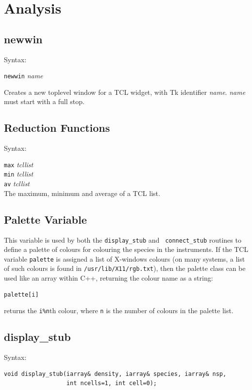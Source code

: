 \section{Analysis}\label{analysis}

\subsection{newwin}\label{TCLnewwin}

Syntax:

{\tt newwin} {\em name}

Creates a new toplevel window for a TCL widget, with Tk identifier
{\em name}. {\em name} must start with a full stop.

\subsection{Reduction Functions}

Syntax:

{\tt max} {\em tcllist}\\
{\tt min} {\em tcllist}\\
{\tt av} {\em tcllist}\\

The maximum, minimum and average of a TCL list.

\subsection{Palette Variable}\label{palette}

This variable is used by both the {\tt display\_stub} and {\tt
  connect\_stub} routines to define a palette of colours for colouring
  the species in the instruments. If the TCL variable {\tt palette} is
  assigned a list of X-windows colours (on many systems, a list of
  such colours is found in {\tt /usr/lib/X11/rgb.txt}),
  then the palette class can be used like an array within C++,
  returning the colour name as a string:
\begin{verbatim}
palette[i]
\end{verbatim}
returns the \verb|i%n|th colour, where {\tt n} is the number of
colours in the palette list.

\subsection{display\_stub}

Syntax:

\begin{verbatim}
void display_stub(iarray& density, iarray& species, iarray& nsp, 
                  int ncells=1, int cell=0);
\end{verbatim}

